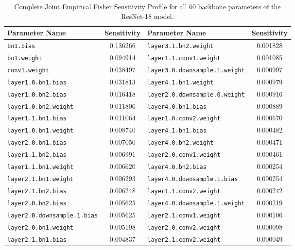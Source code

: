 \documentclass{article}
\theoremstyle{plain}
\theoremstyle{definition}
\theoremstyle{remark}
\begin{document}
\begin{table}[t]
\centering
\caption{Complete Joint Empirical Fisher Sensitivity Profile for all 60 backbone parameters of the ResNet-18 model.}
\label{tab:complete_sensitivity}
\vskip 0.1in
\begin{small}
\begin{sc}
\begin{tabular}{lclc}
\toprule
Parameter Name & Sensitivity & Parameter Name & Sensitivity \\
\midrule
\texttt{bn1.bias} & 0.136266 & \texttt{layer3.1.bn2.weight} & 0.001828 \\
\texttt{bn1.weight} & 0.094914 & \texttt{layer1.1.conv1.weight} & 0.001085 \\
\texttt{conv1.weight} & 0.038497 & \texttt{layer3.0.downsample.1.weight} & 0.000997 \\
\texttt{layer1.0.bn1.bias} & 0.031813 & \texttt{layer4.1.bn1.weight} & 0.000979 \\
\texttt{layer1.0.bn2.bias} & 0.016418 & \texttt{layer2.0.downsample.0.weight} & 0.000916 \\
\texttt{layer1.0.bn2.weight} & 0.011806 & \texttt{layer4.0.bn1.bias} & 0.000889 \\
\texttt{layer1.1.bn1.bias} & 0.011064 & \texttt{layer1.0.conv2.weight} & 0.000670 \\
\texttt{layer1.0.bn1.weight} & 0.008740 & \texttt{layer4.1.bn1.bias} & 0.000482 \\
\texttt{layer2.0.bn1.bias} & 0.007050 & \texttt{layer4.0.bn2.weight} & 0.000471 \\
\texttt{layer1.1.bn2.bias} & 0.006991 & \texttt{layer2.0.conv1.weight} & 0.000461 \\
\texttt{layer1.1.bn1.weight} & 0.006620 & \texttt{layer4.0.bn2.bias} & 0.000254 \\
\texttt{layer2.1.bn1.weight} & 0.006293 & \texttt{layer4.0.downsample.1.bias} & 0.000254 \\
\texttt{layer2.1.bn2.bias} & 0.006248 & \texttt{layer1.1.conv2.weight} & 0.000242 \\
\texttt{layer2.0.bn2.bias} & 0.005625 & \texttt{layer4.0.downsample.1.weight} & 0.000219 \\
\texttt{layer2.0.downsample.1.bias} & 0.005625 & \texttt{layer2.1.conv1.weight} & 0.000106 \\
\texttt{layer2.0.bn1.weight} & 0.005198 & \texttt{layer2.0.conv2.weight} & 0.000098 \\
\texttt{layer2.1.bn1.bias} & 0.004837 & \texttt{layer2.1.conv2.weight} & 0.000049 \\

\end{tabular}
\end{sc}
\end{small}
\end{table}
\end{document}
